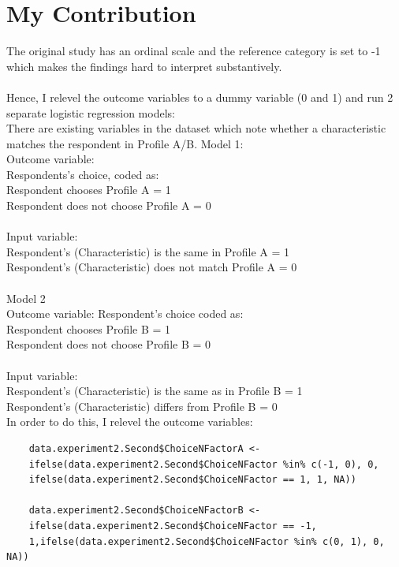 \documentclass{article}
\begin{document}
\section{My Contribution}
The original study has an ordinal scale and the reference category is set 
to -1 which makes the findings hard to interpret substantively.
\\
\\
Hence, I relevel the outcome variables to a dummy variable (0 and 1) and 
run 2 separate logistic regression models:
\\
There are existing variables in the dataset which note whether a characteristic matches the respondent in Profile A/B. 
Model 1:
\\
Outcome variable:
\\
Respondents's choice, coded as:
\\
Respondent chooses Profile A = 1
\\
Respondent does not choose Profile A = 0
\\
\\
Input variable:
\\
Respondent's (Characteristic) is the same in Profile A = 1
\\
Respondent's (Characteristic) does not match Profile A = 0
\\
\\
Model 2
\\
Outcome variable: 
Respondent's choice coded as:
\\
Respondent chooses Profile B = 1
\\
Respondent does not choose Profile B = 0
\\
\\
Input variable:
\\
Respondent's (Characteristic) is the same as in Profile B = 1
\\
Respondent's (Characteristic) differs from Profile B = 0
\\
In order to do this, I relevel the outcome variables:
\begin{verbatim}
    data.experiment2.Second$ChoiceNFactorA <- 
    ifelse(data.experiment2.Second$ChoiceNFactor %in% c(-1, 0), 0,
    ifelse(data.experiment2.Second$ChoiceNFactor == 1, 1, NA))

    data.experiment2.Second$ChoiceNFactorB <- 
    ifelse(data.experiment2.Second$ChoiceNFactor == -1, 
    1,ifelse(data.experiment2.Second$ChoiceNFactor %in% c(0, 1), 0, NA))

\end{verbatim}
\end{document}
